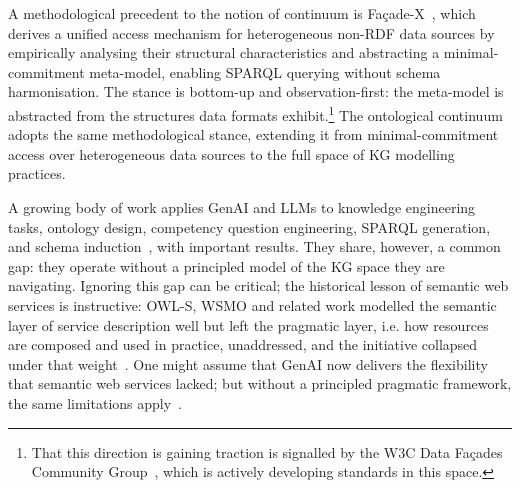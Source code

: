 \documentclass[runningheads]{llncs}
\newenvironment{onlyextended}{\ignorespaces}{\ignorespacesafterend}
\newenvironment{inboth}{}{}
\begin{document}
\begin{inboth}A methodological precedent to the notion of continuum is Fa\c{c}ade-X~\cite{asprino2023knowledge}, which derives a unified access mechanism for heterogeneous non-RDF data sources by empirically analysing their structural characteristics and abstracting a minimal-commitment meta-model, enabling SPARQL querying without schema harmonisation. 
The stance is bottom-up and observation-first: the meta-model is abstracted from the structures data formats exhibit.\footnote{That this direction is gaining traction is signalled by the W3C Data Fa\c{c}ades Community Group~\cite{w3c:facadex}, which is actively developing standards in this space.} 
\end{inboth}
\begin{onlyextended}The ontological continuum adopts the same methodological stance, extending it from minimal-commitment access over heterogeneous data sources to the full space of KG modelling practices. 
\end{onlyextended}


\begin{inboth}
A growing body of work applies GenAI and LLMs to knowledge engineering tasks, ontology design, competency question engineering, SPARQL generation, and schema induction~\cite{garijo2024llms}, with important results. 
They share, however, a common gap: they operate without a principled model of the KG space they are navigating.
Ignoring this gap can be critical; the historical lesson of semantic web services is instructive: OWL-S, WSMO and related work modelled the semantic layer of service description well but left the pragmatic layer, i.e. how resources are composed and used in practice, unaddressed, and the initiative collapsed under that weight~\cite{cabral2004approaches,WSMO2006,owls2004,martin2004owls}. 
One might assume that GenAI now delivers the flexibility that semantic web services lacked; but without a principled pragmatic framework, the same limitations apply~\cite{payne-et-al2026}.
\end{inboth}

\end{document}
